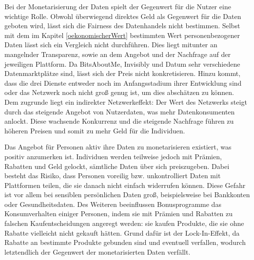 \noindent Bei der Monetarisierung der Daten spielt der Gegenwert für die Nutzer eine wichtige Rolle. Obwohl überwiegend direktes Geld als Gegenwert für die Daten geboten wird, lässt sich die Fairness des Datenhandels nicht bestimmen. Selbst mit dem im Kapitel \ref{oekonomischerWert} bestimmten Wert personenbezogener Daten lässt sich ein Vergleich nicht durchführen. Dies liegt mitunter an mangelnder Transparenz, sowie an dem Angebot und der Nachfrage auf der jeweiligen Plattform. Da BitsAboutMe, Invisibly und Datum sehr verschiedene Datenmarktplätze sind, lässt sich der Preis nicht konkretisieren. Hinzu kommt, dass die drei Dienste entweder noch im Anfangsstadium ihrer Entwicklung sind oder das Netzwerk noch nicht groß genug ist, um dies abschätzen zu können. Dem zugrunde liegt ein indirekter Netzwerkeffekt: Der Wert des Netzwerks steigt durch das steigende Angebot von Nutzerdaten, was mehr Datenkonsumenten anlockt. Diese wachsende Konkurrenz und die steigende Nachfrage führen zu höheren Preisen und somit zu mehr Geld für die Individuen. \newline

\noindent Das Angebot für Personen aktiv ihre Daten zu monetarisieren existiert, was positiv anzumerken ist. Individuen werden teilweise jedoch mit Prämien, Rabatten und Geld gelockt, sämtliche Daten über sich preiszugeben. Dabei besteht das Risiko, dass Personen voreilig bzw. unkontrolliert Daten mit Plattformen teilen, die sie danach nicht einfach widerrufen können. Diese Gefahr ist vor allem bei sensiblen persönlichen Daten groß, beispielsweise bei Bankkonten oder Gesundheitsdaten. Des Weiteren beeinflussen Bonusprogramme das Konsumverhalten einiger Personen, indem sie mit Prämien und Rabatten zu falschen Kaufentscheidungen angeregt werden: sie kaufen Produkte, die sie ohne Rabatte vielleicht nicht gekauft hätten. Grund dafür ist der Lock-In-Effekt, da Rabatte an bestimmte Produkte gebunden sind und eventuell verfallen, wodurch letztendlich der Gegenwert der monetarisierten Daten verfällt. \newline

